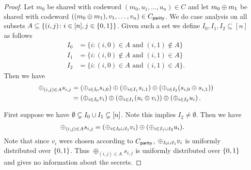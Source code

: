 \begin{proof}
	Let $m_0$ be shared with codeword $(m_0, u_1,\dotsc, u_n) \in C$ and let $m_0\oplus m_1$ be shared with codeword $((m_0\oplus m_1), v_1,\dotsc,v_n) \in C_\mathsf{parity}$.
	We do case analysis on all subsets $A \subseteq \{ (i,j) \colon i \in [n], j \in {\{0,1\}} \}$.
	Given such a set we define $I_0, I_1, I_2 \subseteq [n]$ as follows
	\begin{align*}
		I_0 &= \{ i \colon (i,0) \in A \text{ and } (i,1)\not\in A\}\\
		I_1 &= \{ i \colon (i,0) \not\in A \text{ and } (i,1)\in A\}\\
		I_2 &= \{ i \colon (i,0) \in A \text{ and } (i,1)\in A\}.
	\end{align*}
	Then we have
	\begin{align*}
		\oplus_{(i,j) \in A} s_{i,j} &= \left(\oplus_{i \in I_0} s_{i,0}\right) \oplus \left( \oplus_{i \in I_1} s_{i,1} \right) \oplus \left( \oplus_{i \in I_2}(s_{i,0} \oplus s_{i,1}) \right)\\
		&= \left( \oplus_{i \in I_0} v_i \right) \oplus \left( \oplus_{i \in I_1} (u_i \oplus v_i) \right) \oplus \left(\oplus_{i \in I_2} u_i\right).
	\end{align*}
	
	First suppose we have $\emptyset \subsetneq I_0 \cup I_1 \subsetneq [n]$.
	Note this implies $I_2 \neq \emptyset$.
	Then we have
	\begin{align*}
		\oplus_{(i,j) \in A} s_{i,j} &= (\oplus_{i \in I_0\cup I_1} v_i) \oplus (\oplus_{i \in I_1 \cup I_2} u_i).
	\end{align*}
	Note that since $v_i$ were chosen according to $C_\mathsf{parity}$, $\oplus_{I_0 \cup I_1} v_i$ is uniformly distributed over ${\{0,1\}}$. 
	Thus $\oplus_{(i,j) \in A} s_{i,j}$ is uniformly distributed over ${\{0,1\}}$ and gives no information about the secrets.
	

\end{proof}

